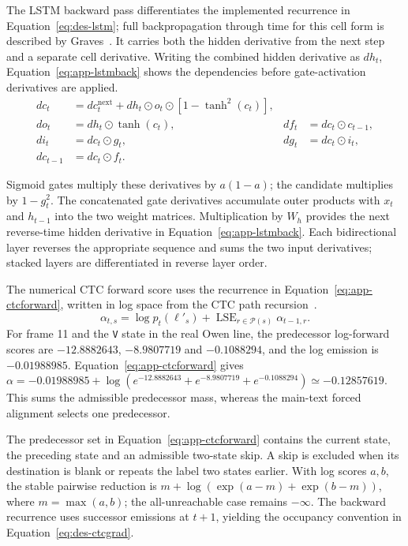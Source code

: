 The LSTM backward pass differentiates the implemented recurrence in Equation~\ref{eq:des-lstm}; full backpropagation through time for this cell form is described by Graves~\cite[pp.~4--5]{graves2013}. It carries both the hidden derivative from the next step and a separate cell derivative. Writing the combined hidden derivative as $d h_t$, Equation~\ref{eq:app-lstmback} shows the dependencies before gate-activation derivatives are applied.
\begin{equation}
\begin{aligned}
d c_t&=d c_t^{\mathrm{next}}+d h_t\odot o_t\odot[1-\tanh^2(c_t)],\\
d o_t&=d h_t\odot\tanh(c_t),& d f_t&=d c_t\odot c_{t-1},\\
d i_t&=d c_t\odot g_t,&d g_t&=d c_t\odot i_t,\\
d c_{t-1}&=d c_t\odot f_t.
\end{aligned}
\label{eq:app-lstmback}
\end{equation}


Sigmoid gates multiply these derivatives by $a(1-a)$; the candidate multiplies by $1-g_t^2$. The concatenated gate derivatives accumulate outer products with $x_t$ and $h_{t-1}$ into the two weight matrices. Multiplication by $W_h$ provides the next reverse-time hidden derivative in Equation~\ref{eq:app-lstmback}. Each bidirectional layer reverses the appropriate sequence and sums the two input derivatives; stacked layers are differentiated in reverse layer order.

The numerical CTC forward score uses the recurrence in Equation~\ref{eq:app-ctcforward}, written in log space from the CTC path recursion~\cite[PDF p.~4, Sec.~4.1]{graves2006}.
\begin{equation}
\alpha_{t,s}=\log p_t(\ell'_s)+
\operatorname{LSE}_{r\in\mathcal P(s)}\alpha_{t-1,r}.
\label{eq:app-ctcforward}
\end{equation}
For frame 11 and the \texttt{V} state in the real Owen line, the predecessor log-forward scores are $-12.8882643$, $-8.9807719$ and $-0.1088294$, and the log emission is $-0.01988985$. Equation~\ref{eq:app-ctcforward} gives $\alpha=-0.01988985+\log(e^{-12.8882643}+e^{-8.9807719}+e^{-0.1088294})\simeq-0.12857619$. This sums the admissible predecessor mass, whereas the main-text forced alignment selects one predecessor.

The predecessor set in Equation~\ref{eq:app-ctcforward} contains the current state, the preceding state and an admissible two-state skip. A skip is excluded when its destination is blank or repeats the label two states earlier. With log scores $a,b$, the stable pairwise reduction is $m+\log(\exp(a-m)+\exp(b-m))$, where $m=\max(a,b)$; the all-unreachable case remains $-\infty$. The backward recurrence uses successor emissions at $t+1$, yielding the occupancy convention in Equation~\ref{eq:des-ctcgrad}.

